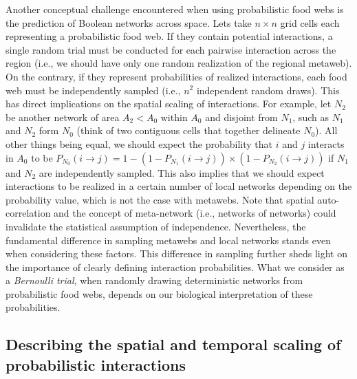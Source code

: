 \documentclass[10pt,oneside]{article}
\begin{document}
Another conceptual challenge encountered when using probabilistic food
webs is the prediction of Boolean networks across space. Lets take
\(n \times n\) grid cells each representing a probabilistic food web. If
they contain potential interactions, a single random trial must be
conducted for each pairwise interaction across the region (i.e., we
should have only one random realization of the regional metaweb). On the
contrary, if they represent probabilities of realized interactions, each
food web must be independently sampled (i.e., \(n^2\) independent random
draws). This has direct implications on the spatial scaling of
interactions. For example, let \(N_2\) be another network of area
\(A_2 < A_0\) within \(A_0\) and disjoint from \(N_1\), such as \(N_1\)
and \(N_2\) form \(N_0\) (think of two contiguous cells that together
delineate \(N_0\)). All other things being equal, we should expect the
probability that \(i\) and \(j\) interacts in \(A_0\) to be
\(P_{N_0}(i \rightarrow j) = 1 - (1 - P_{N_1}(i \rightarrow j)) \times (1 - P_{N_2}(i \rightarrow j))\)
if \(N_1\) and \(N_2\) are independently sampled. This also implies that
we should expect interactions to be realized in a certain number of
local networks depending on the probability value, which is not the case
with metawebs. Note that spatial auto-correlation and the concept of
meta-network (i.e., networks of networks) could invalidate the
statistical assumption of independence. Nevertheless, the fundamental
difference in sampling metawebs and local networks stands even when
considering these factors. This difference in sampling further sheds
light on the importance of clearly defining interaction probabilities.
What we consider as a \emph{Bernoulli trial}, when randomly drawing
deterministic networks from probabilistic food webs, depends on our
biological interpretation of these probabilities.

\hypertarget{describing-the-spatial-and-temporal-scaling-of-probabilistic-interactions}{%
\subsection{Describing the spatial and temporal scaling of probabilistic
interactions}\label{describing-the-spatial-and-temporal-scaling-of-probabilistic-interactions}}
\end{document}
